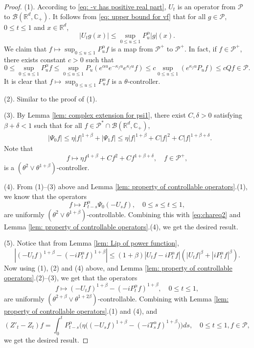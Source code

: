 \documentclass[12pt,a4paper]{amsart}
\theoremstyle{plain}
\theoremstyle{definition}
\numberwithin{equation}{section}
\begin{document}
\begin{proof}
  (1). According to \eqref{eq: -v has positive real part}, $U_t$ is an operator from $\mathcal P$ to $\mathcal B(\mathbb R^d, \mathbb C_+)$.
  It follows from \eqref{eq: upper bound for vf} that for all $g\in \mathcal P$, $0\leq t\leq 1$ and $x\in \mathbb R^d$,
  \[
    |U_t g(x)|
    \leq \sup_{0\leq u\leq 1}P_u^\alpha |g| (x).
  \]
  We claim that $f\mapsto\sup_{0\leq u\leq 1}P^{\alpha}_u f$ is a map from $\mathcal P^+$ to $\mathcal P^+$. In fact, if $f\in \mathcal P^+$, there exists constant $c>0$ such that
  \[
    0
    \leq \sup_{0\leq u\leq 1}P^{\alpha}_u f
    \leq \sup_{0\leq u\leq 1} P_u (e^{\alpha u} e^{-\kappa_f u} e^{\kappa_f u} f )
    \leq c \sup_{0\leq u\leq 1} (e^{\kappa_fu}P_u f) \leq c Qf \in \mathcal P.
  \]
	It is clear that $f\mapsto\sup_{0\leq u\leq 1}P^{\alpha}_u f$ is a $\theta$-controller.
  
  (2). Similar to the proof of (1).
  
  (3). By Lemma \ref{lem: complex extension for psi1}, there exist $C, \delta >0$ satisfying $\beta+\delta< 1$ such that for all $ f \in \mathcal P^* \cap \mathcal B( \mathbb R^d, \mathbb C_+ )$,
  \begin{align}
    &|\Psi_0 f|
      \leq \eta |f|^{1+\beta} + |\Psi_1 f|
      \leq \eta |f|^{1+\beta} + C|f|^2+ C |f|^{1+\beta + \delta}.
  \end{align}
  Note that
  \[
    f \mapsto \eta f^{1+\beta} + Cf^2+ Cf^{1+\beta + \delta}
    , \quad f\in \mathcal P^+,
  \]
  is a $(\theta^2 \vee \theta^{1+\beta})$-controller.
  
  (4). 
  From (1)--(3) above and Lemma \ref{lem: property of controllable operators}.(1), we know that the operators
  \[
    f \mapsto P^\alpha_{t-s}\Psi_0(-U_sf)
    , \quad 0\leq s\leq t\leq 1,
  \]
  are uniformly $(\theta^2\vee \theta^{1+\beta})$-controllable.
  Combining this with \eqref{eq:chareq2} and 
  Lemma \ref{lem: property of controllable operators}.(4), we get the desired result.
  
  (5). Notice that from Lemma \ref{lem: Lip of power function},
  \[
    |(-U_t f)^{1+\beta} - (-iP^\alpha_t f)^{1+\beta} |
    \leq  (1+\beta) |U_t f-iP^\alpha_t f|(|U_t f|^{\beta}+|i P^\alpha_t f|^{\beta}).
  \]
  Now using (1), (2) and  (4) above, and Lemma \ref{lem: property of controllable operators}.(2)--(3), we get that the operators
  \[
    f \mapsto (-U_t f)^{1+\beta} - (-iP^\alpha_t f)^{1+\beta},\quad 0\leq t\leq 1,
  \]
  are uniformly $(\theta^{2+\beta}\vee \theta^{1+2\beta})$-controllable.
  Combining with Lemma \ref{lem: property of controllable operators}.(1) and (4), and
  \begin{equation}
    (Z'_t - Z_t)f 
    = \int_0^t P^\alpha_{t-s}\Big( \eta \big((-U_s f)^{1+\beta} - (-iT_s^\alpha f)^{1+\beta} \big)\Big)ds
    , \quad 0\leq t\leq 1, f\in \mathcal P,
  \end{equation}
  we get the desired result.
  

\end{proof}
\end{document}
